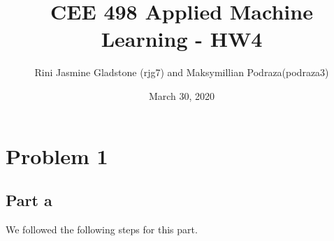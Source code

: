 \documentclass{article}      %
\title{CEE 498 Applied Machine Learning - HW4}  %
\author{Rini Jasmine Gladstone (rjg7) and Maksymillian Podraza(podraza3)}      %
\date{March 30, 2020}      %
\begin{document}

\maketitle                   %


\section{Problem 1}      %

\subsection{Part a}

We followed the following steps for this part.
\end{document}
